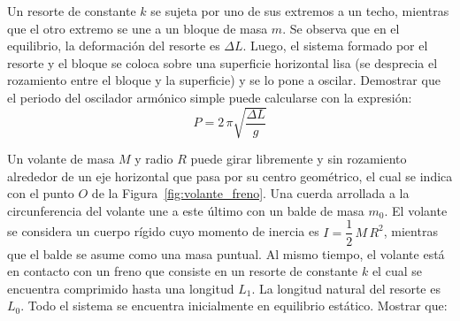 \documentclass[addpoints]{exam}
\newcommand{\ver}[1]{\hat{\mathbf{#1}}}
\begin{document}
\begin{questions}
    \question Un resorte de constante $k$ se sujeta por uno de sus extremos a un techo, mientras que el otro extremo se une a un bloque de masa $m$. Se observa que en el equilibrio, la deformación del resorte es $\Delta L$. Luego, el sistema formado por el resorte y el bloque se coloca sobre una superficie horizontal lisa (se desprecia el rozamiento entre el bloque y la superficie) y se lo pone a oscilar. Demostrar que el periodo del oscilador armónico simple puede calcularse con la expresión: $$ P = 2 \, \pi \sqrt{\frac{\Delta L}{g}} $$


    \pagebreak

    \question \label{ej:volante_freno} Un volante de masa $M$ y radio $R$ puede girar libremente y sin rozamiento alrededor de un eje horizontal que pasa por su centro geométrico, el cual se indica con el punto $O$ de la Figura~\ref{fig:volante_freno}. Una cuerda arrollada a la circunferencia del volante une a este último con un balde de masa $m_0$. El volante se considera un cuerpo rígido cuyo momento de inercia es $I = \dfrac{1}{2} \, M \, R^2$, mientras que el balde se asume como una masa puntual. Al mismo tiempo, el volante está en contacto con un freno que consiste en un resorte de constante $k$ el cual se encuentra comprimido hasta una longitud $L_1$. La longitud natural del resorte es $L_0$. Todo el sistema se encuentra inicialmente en equilibrio estático. Mostrar que:


\end{questions}
\end{document}
